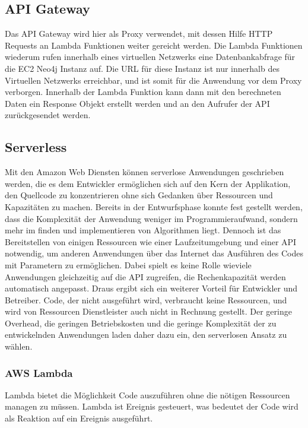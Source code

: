 \subsection{API Gateway}

Das API Gateway wird hier als Proxy verwendet, mit dessen Hilfe HTTP Requests an Lambda Funktionen weiter gereicht werden. Die Lambda Funktionen wiederum rufen innerhalb eines virtuellen Netzwerks eine Datenbankabfrage für die EC2 Neo4j Instanz auf. Die URL für diese Instanz ist nur innerhalb des Virtuellen Netzwerks erreichbar, und ist somit für die Anwendung vor dem Proxy verborgen. Innerhalb der Lambda Funktion kann dann mit den berechneten Daten ein Response Objekt erstellt werden und an den Aufrufer der API zurückgesendet werden. 

\subsection{Serverless}

Mit den Amazon Web Diensten können serverlose Anwendungen geschrieben werden, die es dem Entwickler ermöglichen sich auf den Kern der Applikation, den Quellcode zu konzentrieren ohne sich Gedanken über Ressourcen und Kapazitäten zu machen. Bereits in der Entwurfsphase konnte fest gestellt werden, dass die Komplexität der Anwendung weniger im Programmieraufwand, sondern mehr im finden und implementieren von Algorithmen liegt. Dennoch ist das Bereitstellen von einigen Ressourcen wie einer Laufzeitumgebung und einer API notwendig, um anderen Anwendungen über das Internet das Ausführen des Codes mit Parametern zu ermöglichen. Dabei spielt es keine Rolle wieviele Anwendungen gleichzeitig auf die API zugreifen, die Rechenkapazität werden automatisch angepasst. Draus ergibt sich ein weiterer Vorteil für Entwickler und Betreiber. Code, der nicht ausgeführt wird, verbraucht keine Ressourcen, und wird von Ressourcen Dienstleister auch nicht in Rechnung gestellt. 
Der geringe Overhead, die geringen Betriebskosten und die geringe Komplexität der zu entwickelnden Anwendungen laden daher dazu ein, den serverlosen Ansatz zu wählen. 

\subsubsection{AWS Lambda}

Lambda bietet die Möglichkeit Code auszuführen ohne die nötigen Ressourcen managen zu müssen. Lambda ist Ereignis gesteuert, was bedeutet der Code wird als Reaktion auf ein Ereignis ausgeführt. 
